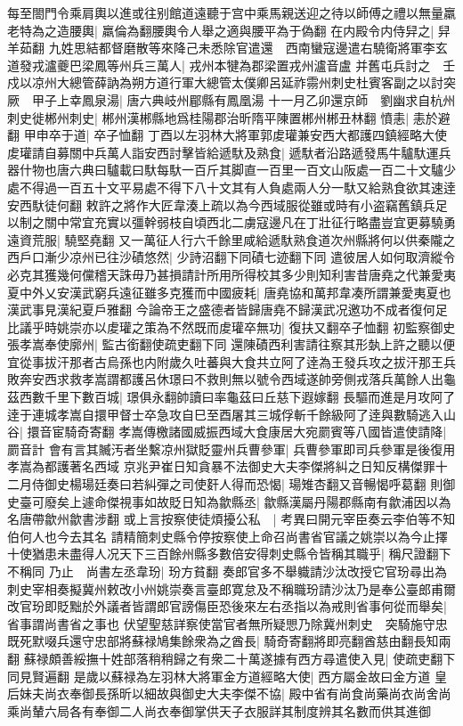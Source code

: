 每至閤門令乘肩輿以進或往别館道遠聽于宫中乘馬親送迎之待以師傅之禮以無量羸老特為之造腰輿|{
	羸倫為翻腰輿令人舉之適與腰平為于偽翻}
在内殿令内侍舁之|{
	舁羊茹翻}
九姓思結都督磨散等來降己未悉除官遣還　西南蠻寇邊遣右驍衛將軍李玄道發戎瀘夔巴梁鳳等州兵三萬人|{
	戎州本犍為郡梁置戎州瀘音盧}
并舊屯兵討之　壬戍以凉州大總管薛訥為朔方道行軍大總管太僕卿呂延祚霛州刺史杜賓客副之以討突厥　甲子上幸鳳泉湯|{
	唐六典岐州郿縣有鳳凰湯}
十一月乙卯還京師　劉幽求自杭州刺史徙郴州刺史|{
	郴州漢郴縣地爲桂陽郡治昕隋平陳置郴州郴丑林翻}
憤恚|{
	恚於避翻}
甲申卒于道|{
	卒子恤翻}
丁酉以左羽林大將軍郭䖍瓘兼安西大都護四鎮經略大使䖍瓘請自募關中兵萬人詣安西討擊皆給遞馱及熟食|{
	遞馱者沿路遞發馬牛驢馱運兵器什物也唐六典曰驢載曰馱每馱一百斤其脚直一百里一百文山阪處一百二十文驢少處不得過一百五十文平易處不得下八十文其有人負處兩人分一馱又給熟食欲其速逹安西馱徒何翻}
敕許之將作大匠韋湊上疏以為今西域服從雖或時有小盗竊舊鎮兵足以制之關中常宜充實以彊幹弱枝自頃西北二虜寇邊凡在丁壯征行略盡豈宜更募驍勇遠資荒服|{
	驍堅堯翻}
又一萬征人行六千餘里咸給遞馱熟食道次州縣將何以供秦隴之西戶口漸少凉州已往沙磧悠然|{
	少詩沼翻下同磧七迹翻下同}
遣彼居人如何取濟縱令必克其獲幾何儻稽天誅毋乃甚損請計所用所得校其多少則知利害昔唐堯之代兼愛夷夏中外乂安漢武窮兵遠征雖多克獲而中國疲耗|{
	唐堯協和萬邦韋凑所謂兼愛夷夏也漢武事見漢紀夏戶雅翻}
今論帝王之盛德者皆歸唐堯不歸漢武况邀功不成者復何足比議乎時姚崇亦以䖍瓘之策為不然既而䖍瓘卒無功|{
	復扶又翻卒子恤翻}
初監察御史張孝嵩奉使廓州|{
	監古銜翻使疏吏翻下同}
還陳磧西利害請往察其形埶上許之聽以便宜從事拔汗那者古烏孫也内附歲久吐蕃與大食共立阿了逹為王發兵攻之拔汗那王兵敗奔安西求救孝嵩謂都護呂休璟曰不救則無以號令西域遂帥旁側戎落兵萬餘人出龜茲西數千里下數百城|{
	璟俱永翻帥讀曰率龜茲曰丘慈下遐嫁翻}
長驅而進是月攻阿了逹于連城孝嵩自擐甲督士卒急攻自巳至酉屠其三城俘斬千餘級阿了逹與數騎逃入山谷|{
	擐音宦騎奇寄翻}
孝嵩傳檄諸國威振西域大食康居大宛罽賓等八國皆遣使請降|{
	罽音計}
會有言其贓汚者坐繫凉州獄貶靈州兵曹參軍|{
	兵曹參軍即司兵參軍是後復用孝嵩為都護著名西域}
京兆尹崔日知貪暴不法御史大夫李傑將糾之日知反構傑罪十二月侍御史楊瑒廷奏曰若糾彈之司使姧人得而恐愒|{
	瑒雉杏翻又音暢愒呼葛翻}
則御史臺可廢矣上遽命傑視事如故貶日知為歙縣丞|{
	歙縣漢屬丹陽郡縣南有歙浦因以為名唐帶歙州歙書涉翻}
或上言按察使徒煩擾公私　|{
	考異曰開元宰臣奏云李伯等不知伯何人也今去其名}
請精簡刺史縣令停按察使上命召尚書省官議之姚崇以為今止擇十使猶患未盡得人况天下三百餘州縣多數倍安得刺史縣令皆稱其職乎|{
	稱尺證翻下不稱同}
乃止　尚書左丞韋玢|{
	玢方貧翻}
奏郎官多不舉軄請沙汰改授它官玢尋出為刺史宰相奏擬冀州敕改小州姚崇奏言臺郎寛怠及不稱職玢請沙汰乃是奉公臺郎甫爾改官玢即貶黜於外議者皆謂郎官謗傷臣恐後來左右丞指以為戒則省事何從而舉矣|{
	省事謂尚書省之事也}
伏望聖慈詳察使當官者無所疑愳乃除冀州刺史　突騎施守忠既死默啜兵還守忠部將蘇禄鳩集餘衆為之酋長|{
	騎奇寄翻將即亮翻酋慈由翻長知兩翻}
蘇禄頗善綏撫十姓部落稍稍歸之有衆二十萬遂據有西方尋遣使入見|{
	使疏吏翻下同見賢遍翻}
是歲以蘇禄為左羽林大將軍金方道經略大使|{
	西方屬金故曰金方道}
皇后妹夫尚衣奉御長孫昕以細故與御史大夫李傑不協|{
	殿中省有尚食尚藥尚衣尚舍尚乘尚輦六局各有奉御二人尚衣奉御掌供天子衣服詳其制度辨其名數而供其進御}


